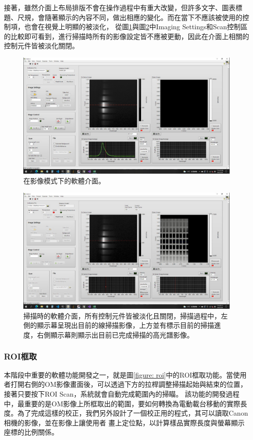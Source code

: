 \documentclass[12pt]{article}
\begin{document}
接著，雖然介面上布局排版不會在操作過程中有重大改變，但許多文字、圖表標題、尺規，會隨著顯示的內容不同，做出相應的變化。而在當下不應該被使用的控制項，也會在視覺上明顯的被淡化，
從圖\ref{figure: acquire mode}與圖\ref{figure: scanning}中Imaging Settings和Scan控制區的比較即可看到，進行掃描時所有的影像設定皆不應被更動，因此在介面上相關的控制元件皆被淡化關閉。
\begin{figure}
    \centering
    \includegraphics[width=\linewidth]{acquire.jpeg}
    \caption{在影像模式下的軟體介面。}
    \label{figure: acquire mode}
\end{figure}
\begin{figure}
    \centering
    \includegraphics[width=\linewidth]{scanning.jpeg}
    \caption[掃描時的軟體介面。]{掃描時的軟體介面，所有控制元件皆被淡化且關閉，掃描過程中，左側的顯示幕呈現出目前的線掃描影像，上方並有標示目前的掃描進度，右側顯示幕則顯示出目前已完成掃描的高光譜影像。}
    \label{figure: scanning}
\end{figure}
\subsubsection{ROI框取}
本階段中重要的軟體功能開發之一，就是圖\ref{figure: roi}中的ROI框取功能。當使用者打開右側的OM影像畫面後，可以透過下方的拉桿調整掃描起始與結束的位置，接著只要按下ROI Scan，系統就會自動完成範圍內的掃瞄。
該功能的開發過程中，最重要的是OM影像上所框取出的範圍，要如何轉換為電動載台移動的實際長度。為了完成這樣的校正，我們另外設計了一個校正用的程式，其可以讀取Canon 相機的影像，並在影像上讓使用者
畫上定位點，以計算樣品實際長度與螢幕顯示座標的比例關係。
\end{document}
